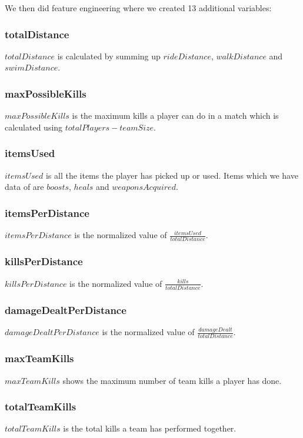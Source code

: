 \documentclass[journal,twoside,web]{ieeecolor}
\begin{document}
We then did feature engineering where we created 13 additional variables:

\subsubsection{totalDistance}
$totalDistance$ is calculated by summing up $rideDistance$, $walkDistance$ and $swimDistance$.

\subsubsection{maxPossibleKills}
$maxPossibleKills$ is the maximum kills a player can do in a match which is calculated using $totalPlayers - teamSize$.

\subsubsection{itemsUsed}
$itemsUsed$ is all the items the player has picked up or used. Items which we have data of are $boosts$, $heals$ and $weaponsAcquired$.

\subsubsection{itemsPerDistance}
$itemsPerDistance$ is the normalized value of $\frac{itemsUsed}{totalDistance}$.

\subsubsection{killsPerDistance}
$killsPerDistance$ is the normalized value of $\frac{kills}{totalDistance}$.

\subsubsection{damageDealtPerDistance}
$damageDealtPerDistance$ is the normalized value of $\frac{damageDealt}{totalDistance}$.

\subsubsection{maxTeamKills}
$maxTeamKills$ shows the maximum number of team kills a player has done.

\subsubsection{totalTeamKills}
$totalTeamKills$ is the total kills a team has performed together.
\end{document}
